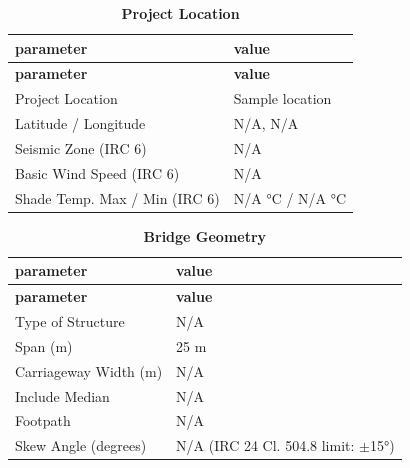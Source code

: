 \documentclass[12pt,a4paper]{report}
\numberwithin{table}{chapter}
\numberwithin{figure}{chapter}
\newcommand{\ReportTableSetup}{%
  \setlength{\tabcolsep}{3.0pt}%
  \renewcommand{\arraystretch}{1.18}%
  \setlength{\arrayrulewidth}{0.4pt}\setlength{\extrarowheight}{0.5pt}%
  \setlength{\LTleft}{\fill}\setlength{\LTright}{\fill}%
  \setlength{\LTpre}{4pt}\setlength{\LTpost}{8pt}}
\newcommand{\ReportTableFont}{\small}
\newcommand{\ReportTableGap}{\vspace{0.5em}}
\begin{document}
\begingroup
\ReportTableSetup
\ReportTableFont
\begin{longtable}{|L{5.5000cm}|L{8.5000cm}|}

\caption{\textbf{Project Location}}
\label{subsec:project-location}\\

\hline
\textbf{parameter} & \textbf{value} \\
\hline
\endfirsthead
\hline
\textbf{parameter} & \textbf{value} \\
\hline
\endhead
\hline
\endfoot
\hline
\endlastfoot

\textnormal{Project Location} & Sample location \\
\hline
\textnormal{Latitude / Longitude} & N/A, N/A \\
\hline
\textnormal{Seismic Zone (IRC 6)} & N/A \\
\hline
\textnormal{Basic Wind Speed (IRC 6)} & N/A \\
\hline
\textnormal{Shade Temp. Max / Min (IRC 6)} & N/A °C / N/A °C \\
\hline
\end{longtable}
\endgroup
\ReportTableGap


\begingroup
\ReportTableSetup
\ReportTableFont
\begin{longtable}{|L{5.5000cm}|L{8.5000cm}|}

\caption{\textbf{Bridge Geometry}}
\label{subsec:bridge-geometry}\\

\hline
\textbf{parameter} & \textbf{value} \\
\hline
\endfirsthead
\hline
\textbf{parameter} & \textbf{value} \\
\hline
\endhead
\hline
\endfoot
\hline
\endlastfoot

\textnormal{Type of Structure} & N/A \\
\hline
\textnormal{Span (m)} & 25 m \\
\hline
\textnormal{Carriageway Width (m)} & N/A \\
\hline
\textnormal{Include Median} & N/A \\
\hline
\textnormal{Footpath} & N/A \\
\hline
\textnormal{Skew Angle (degrees)} & N/A (IRC 24 Cl. 504.8 limit: $\pm$15°) \\
\hline
\end{longtable}
\endgroup

\ReportTableGap
\end{document}
